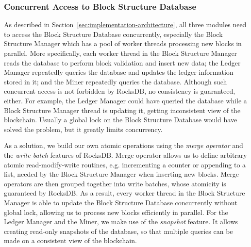 \subsubsection{Concurrent Access to Block Structure Database}


As described in Section~\ref{sec:implementation-architecture}, all three modules need to access the Block Structure Database concurrently, especially the Block Structure Manager which has a pool of worker threads processing new blocks in parallel. More specifically, each worker thread in the Block Structure Manager reads the database to perform block validation and insert new data; the Ledger Manager repeatedly queries the database and updates the ledger information stored in it; and the Miner repeatedly queries the database. Although such concurrent access is not forbidden by RocksDB, no consistency is guaranteed, either. For example, the Ledger Manager could have queried the database while a Block Structure Manager thread is updating it, getting inconsistent view of the blockchain. Usually a global lock on the Block Structure Database would have solved the problem, but it greatly limits concurrency.

As a solution, we build our own atomic operations using the \textit{merge operator} and the \textit{write batch} features of RocksDB. Merge operator allows us to define arbitrary atomic read-modify-write routines, e.g. incrementing a counter or appending to a list, needed by the Block Structure Manager when inserting new blocks. Merge operators are then grouped together into write batches, whose atomicity is guaranteed by RocksDB. As a result, every worker thread in the Block Structure Manager is able to update the Block Structure Database concurrently without global lock, allowing us to process new blocks efficiently in parallel. For the Ledger Manager and the Miner, we make use of the \textit{snapshot} feature. It allows creating read-only snapshots of the database, so that multiple queries can be made on a consistent view of the blockchain. 

